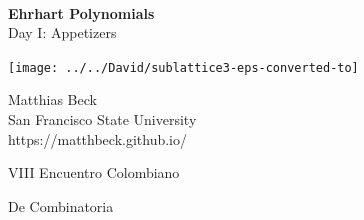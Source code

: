 \documentclass[landscape]{foils}
\def\green{\color{green}}
\def\blue{\color{blue}}
\def\black{\color{black}}
\begin{document}
\setlength{\parindent}{0pt}
\setlength{\parskip}{1cm}

\def\hopen{\mathbb{H}}
\def\Z{\mathbb{Z}}
\def\Q{\mathbb{Q}}
\def\R{\mathbb{R}}
\def\C{\mathcal{C}}
\def\F{\mathcal{F}}
\def\G{\mathcal{G}}
\def\P{\mathcal{P}}
\def\cQ{\mathcal{Q}}
\def\K{\mathcal{K}}
\def\OP{\mathcal{O}}
\def\cZ{\mathcal{Z}}
\def\m{\mathbf{m}}
\def\v{\mathbf{v}}
\def\w{\mathbf{w}}
\def\z{\mathbf{z}}
\newcommand\cone{\operatorname{cone}} 
\newcommand\conv{\operatorname{conv}} 
\newcommand\vol{\operatorname{vol}} 
\newcommand\stir{\operatorname{stirl}}
\newcommand\Ehr{\operatorname{Ehr}} 
\newcommand\fl[1]{\left\lfloor {#1} \right\rfloor} 
\newcommand\fr[1]{\left\{ {#1} \right\}} 
\newcommand\Chat{\widehat{\K}}
\newcommand\PPhat{{\widehat{\Pi}}}
\newcommand\Ccheck{\widecheck{\K}}
\newcommand\PPcheck{\widecheck{\Pi}}

\def\headercolor{\green}


\thispagestyle{empty}
\

\begin{center}
  {\green\LARGE \textbf{Ehrhart Polynomials} \\[12pt]
\normalsize
Day I: Appetizers}
\end{center}

\vspace{-.2in}
\texttt{[image: ../../David/sublattice3-eps-converted-to]}

\vspace{-4.5in} 
\blue
\hspace{5in}
Matthias Beck
\\[5pt]
\black
\hspace{5in}
San Francisco State University
\\[5pt]
\blue
\hspace{5in}
https://matthbeck.github.io/
\black

\vspace{1in} 
\hspace{5in}
VIII Encuentro Colombiano 

\vspace{-.4in} 
\hspace{5in}
De Combinatoria

\black

\newpage
\[  \] 

\vspace{1.5cm} 
\end{document}
